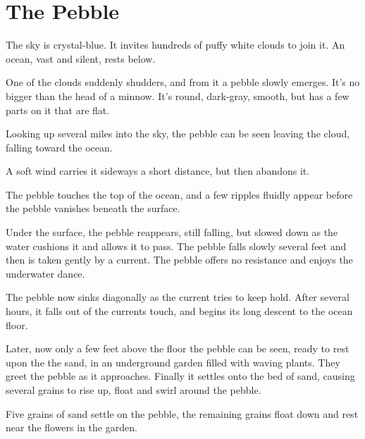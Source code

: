 \chapter{The Pebble}

The sky is crystal-blue. It invites hundreds of puffy white clouds to join it. An ocean, vast and silent, rests below.

One of the clouds suddenly shudders, and from it a pebble slowly emerges. It's no bigger than the head of a minnow. It's round, dark-gray, smooth, but has a few parts on it that are flat.

Looking up several miles into the sky, the pebble can be seen leaving the cloud, falling toward the ocean.

A soft wind carries it sideways a short distance, but then abandons it.

The pebble touches the top of the ocean, and a few ripples fluidly appear before the pebble vanishes beneath the surface.

Under the surface, the pebble reappears, still falling, but slowed down as the water cushions it and allows it to pass. The pebble falls slowly several feet and then is taken gently by a current. The pebble offers no resistance and enjoys the underwater dance.

The pebble now sinks diagonally as the current tries to keep hold. After several hours, it falls out of the currents touch, and begins its long descent to the ocean floor.

Later, now only a few feet above the floor the pebble can be seen, ready to rest upon the the sand, in an underground garden filled with waving plants. They greet the pebble as it approaches. Finally it settles onto the bed of sand, causing several grains to rise up, float and swirl around the pebble.

Five grains of sand settle on the pebble, the remaining grains float down and rest near the flowers in the garden.